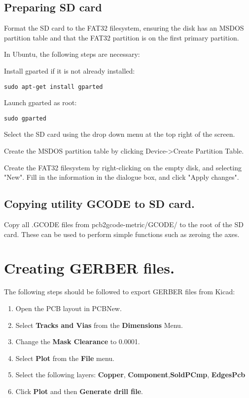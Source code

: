\documentclass[a4paper,11pt]{article}  %
\begin{document}
\subsection{Preparing SD card}
Format the SD card to the FAT32 filesystem, ensuring the disk has an
MSDOS partition table and that the FAT32 partition is on the first
primary partition.

In Ubuntu, the following steps are necessary:

Install gparted if it is not already installed:

\begin{lstlisting}[frame=single,breaklines=true]
sudo apt-get install gparted
\end{lstlisting}

Launch gparted as root:
\begin{lstlisting}[frame=single,breaklines=true]
sudo gparted
\end{lstlisting}

Select the SD card using the drop down menu at the top right of the
screen.

Create the MSDOS partition table by clicking Device-\textgreater Create Partition Table.

Create the FAT32 filesystem by right-clicking on the empty disk, and selecting "New". 
Fill in the information in the dialogue box, and click "Apply changes". 

\subsection{Copying utility GCODE to SD card.}
Copy all .GCODE files from pcb2gcode-metric/GCODE/ to the root of the SD card.
These can be used to perform simple functions such as zeroing the axes.

\section{Creating GERBER files.}
The following steps should be followed to export GERBER files from Kicad:

\begin{enumerate}
	\item	Open the PCB layout in PCBNew.
	\item	Select \textbf{Tracks and Vias} from the \textbf{Dimensions} Menu.
	\item	Change the \textbf{Mask Clearance} to 0.0001.
	\item	Select \textbf{Plot} from the \textbf{File} menu.
	\item	Select the following layers: \textbf{Copper}, \textbf{Component},\textbf{SoldPCmp}, \textbf{EdgesPcb}
	\item	Click \textbf{Plot} and then \textbf{Generate drill file}.
\end{enumerate}
\end{document}
